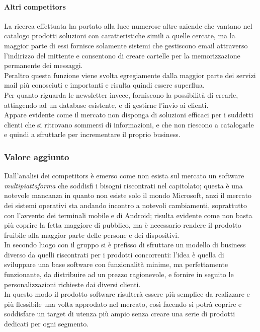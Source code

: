 \paragraph{Altri competitors}
La ricerca effettuata ha portato alla luce numerose altre aziende che vantano nel catalogo prodotti soluzioni con caratteristiche simili a quelle cercate, ma la maggior parte di essi fornisce solamente sistemi che gestiscono email attraverso l'indirizzo del mittente e consentono di creare cartelle per la memorizzazione permanente dei messaggi.\\
Peraltro questa funzione viene svolta egregiamente dalla maggior parte dei servizi mail più conosciuti e importanti e risulta quindi essere superflua.\\
Per quanto riguarda le newsletter invece, forniscono la possibilità di crearle, attingendo ad un database esistente, e di gestirne l'invio ai clienti.\\
Appare evidente come il mercato non disponga di soluzioni efficaci per i suddetti clienti che si ritrovano sommersi di informazioni, e che non riescono a catalogarle e quindi a sfruttarle per incrementare il proprio business.

\subsubsection{Valore aggiunto}
Dall'analisi dei competitors è emerso come non esista sul mercato un software \emph{multipiattaforma} che soddisfi i bisogni riscontrati nel capitolato; questa è una notevole mancanza in quanto non esiste solo il mondo Microsoft, anzi il mercato dei sistemi operativi sta andando incontro a notevoli cambiamenti, soprattutto con l'avvento dei terminali mobile e di Android; risulta evidente come non basta più coprire la fetta maggiore di pubblico, ma è necessario rendere il prodotto fruibile alla maggior parte delle persone e dei dispositivi.\\
In secondo luogo con \NOMEPROGETTO{} il gruppo si è prefisso di sfruttare un modello di business diverso da quelli riscontrati per i prodotti concorrenti: l'idea è quella di sviluppare una base software con funzionalità minime, ma perfettamente funzionante, da distribuire ad un prezzo ragionevole, e fornire in seguito le personalizzazioni richieste dai diversi clienti.\\
In questo modo il prodotto software risulterà essere più semplice da realizzare e più flessibile una volta approdato nel mercato, così facendo si potrà coprire e soddisfare un target di utenza più ampio senza creare una serie di prodotti dedicati per ogni segmento.

